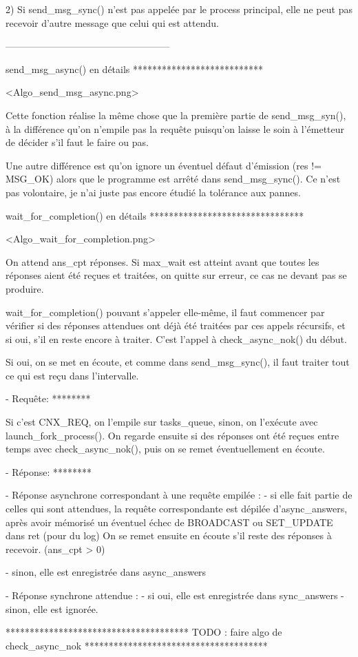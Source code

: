 2)
Si send_msg_sync() n'est pas appelée par le process principal, elle ne peut pas recevoir d'autre
message que celui qui est attendu.

---------------------------------------------------


send_msg_async() en détails
***************************

<Algo_send_msg_async.png>

Cette fonction réalise la même chose que la première partie de send_msg_syn(), à la différence qu'on
n'empile pas la requête puisqu'on laisse le soin à l'émetteur de décider s'il faut le faire ou pas.

Une autre différence est qu'on ignore un éventuel défaut d'émission (res != MSG_OK) alors que le
programme est arrêté dans send_msg_sync(). Ce n'est pas volontaire, je n'ai juste pas encore étudié
la tolérance aux pannes.


wait_for_completion() en détails
********************************

<Algo_wait_for_completion.png>

On attend ans_cpt réponses. Si max_wait est atteint avant que toutes les réponses aient été reçues
et traitées, on quitte sur erreur, ce cas ne devant pas se produire.

wait_for_completion() pouvant s'appeler elle-même, il faut commencer par vérifier si des réponses
attendues ont déjà été traitées par ces appels récursifs, et si oui, s'il en reste encore à traiter.
C'est l'appel à check_async_nok() du début.

Si oui, on se met en écoute, et comme dans send_msg_sync(), il faut traiter tout ce qui est reçu
dans l'intervalle.

- Requête:
  ********

  Si c'est CNX_REQ, on l'empile sur tasks_queue, sinon, on l'exécute avec launch_fork_process().
  On regarde ensuite si des réponses ont été reçues entre temps avec check_async_nok(), puis on se
  remet éventuellement en écoute.

- Réponse:
  ********

  - Réponse asynchrone correspondant à une requête empilée :
    - si elle fait partie de celles qui sont attendues, la requête correspondante est dépilée
    d'async_answers, après avoir mémorisé un éventuel échec de BROADCAST ou SET_UPDATE dans ret
    (pour du log)
    On se remet ensuite en écoute s'il reste des réponses à recevoir. (ans_cpt > 0)

    - sinon, elle est enregistrée dans async_answers

  - Réponse synchrone attendue :
    - si oui, elle est enregistrée dans sync_answers
    - sinon, elle est ignorée.


**************************************
TODO : faire algo de check_async_nok
**************************************
